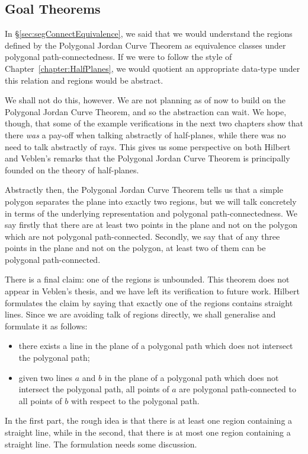 \subsection{Goal Theorems}
In \S\ref{sec:segConnectEquivalence}, we said that we would understand the regions defined by the Polygonal Jordan Curve Theorem as equivalence classes under polygonal path-connectedness. If we were to follow the style of Chapter~\ref{chapter:HalfPlanes}, we would quotient an appropriate data-type under this relation and regions would be abstract.
 
We shall not do this, however. We are not planning as of now to build on the Polygonal Jordan Curve Theorem, and so the abstraction can wait. We hope, though, that some of the example verifications in the next two chapters show that there \emph{was} a pay-off when talking abstractly of half-planes, while there was no need to talk abstractly of rays. This gives us some perspective on both Hilbert and Veblen's remarks that the Polygonal Jordan Curve Theorem is principally founded on the theory of half-planes.

Abstractly then, the Polygonal Jordan Curve Theorem tells us that a simple polygon separates the plane into exactly two regions, but we will talk concretely in terms of the underlying representation and polygonal path-connectedness. We say firstly that there are at least two points in the plane and not on the polygon which are not polygonal path-connected. Secondly, we say that of any three points in the plane and not on the polygon, at least two of them can be polygonal path-connected.

There is a final claim: one of the regions is unbounded. This theorem does not appear in Veblen's thesis, and we have left its verification to future work. Hilbert formulates the claim by saying that exactly one of the regions contains straight lines. Since we are avoiding talk of regions directly, we shall generalise and formulate it as follows:
\begin{itemize}
\item there exists a line in the plane of a polygonal path which does not intersect the polygonal path;
\item given two lines $a$ and $b$ in the plane of a polygonal path which does not intersect the polygonal path, all points of $a$ are polygonal path-connected to all points of $b$ with respect to the polygonal path.
\end{itemize}

In the first part, the rough idea is that there is at least one region containing a straight line, while in the second, that there is at most one region containing a straight line. The formulation needs some discussion. 

